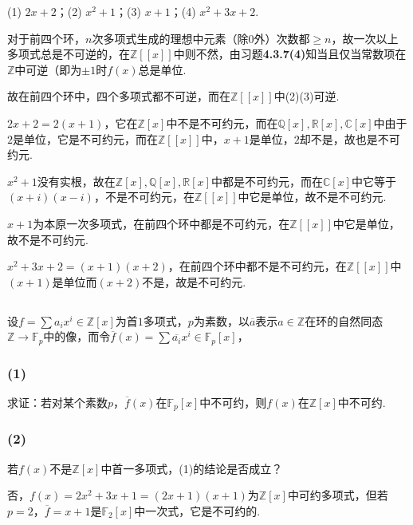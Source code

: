 (1) $2x+2$；(2) $x^2+1$；(3) $x+1$；(4) $x^2+3x+2$.

\jie 对于前四个环，$n$次多项式生成的理想中元素（除$0$外）次数都$\geq n$，故一次以上多项式总是不可逆的，在$\mathbb{Z}[[x]]$中则不然，由{\heiti 习题}\textbf{4.3.7(4)}知当且仅当常数项在$\mathbb{Z}$中可逆（即为$\pm 1$时$f(x)$总是单位.

故在前四个环中，四个多项式都不可逆，而在$\mathbb{Z}[[x]]$中(2)(3)可逆.

$2x+2=2(x+1)$，它在$\mathbb{Z}[x]$中不是不可约元，而在$\mathbb{Q}[x],\mathbb{R}[x],\mathbb{C}[x]$中由于$2$是单位，它是不可约元，而在$\mathbb{Z}[[x]]$中，$x+1$是单位，$2$却不是，故也是不可约元.

$x^2+1$没有实根，故在$\mathbb{Z}[x], \mathbb{Q}[x], \mathbb{R}[x]$中都是不可约元，而在$\mathbb{C}[x]$中它等于$(x+i)(x-i)$，不是不可约元，在$\mathbb{Z}[[x]]$中它是单位，故不是不可约元.

$x+1$为本原一次多项式，在前四个环中都是不可约元，在$\mathbb{Z}[[x]]$中它是单位，故不是不可约元.

$x^2+3x+2=(x+1)(x+2)$，在前四个环中都不是不可约元，在$\mathbb{Z}[[x]]$中$(x+1)$是单位而$(x+2)$不是，故是不可约元.

\subsection{}
设$f=\sum a_ix^i\in\mathbb{Z}[x]$为首$1$多项式，$p$为素数，以$\overline{a}$表示$a\in\mathbb{Z}$在环的自然同态$\mathbb{Z}\rightarrow\mathbb{F}_p$中的像，而令$\overline{f}(x)=\sum \overline{a_i}x^i\in\mathbb{F}_p[x]$，

\subsubsection{(1)}
求证：若对某个素数$p$，$\overline{f}(x)$在$\mathbb{F}_p[x]$中不可约，则$f(x)$在$\mathbb{Z}[x]$中不可约.


\subsubsection{(2)}
若$f(x)$不是$\mathbb{Z}[x]$中首一多项式，(1)的结论是否成立？

\jie 否，$f(x)=2x^2+3x+1=(2x+1)(x+1)$为$\mathbb{Z}[x]$中可约多项式，但若$p=2$，$\overline{f}=x+1$是$\mathbb{F}_2[x]$中一次式，它是不可约的.

